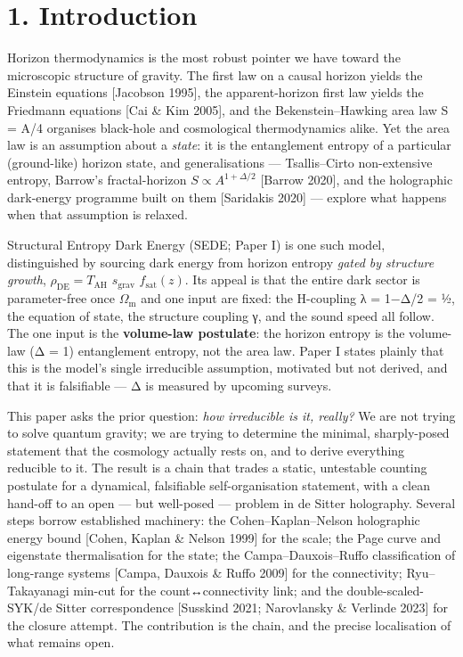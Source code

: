 \documentclass[
  10pt,
]{article}
\begin{document}
{
\hypersetup{linkcolor=}
\setcounter{tocdepth}{2}
\tableofcontents
}
\section{1. Introduction}\label{introduction}

Horizon thermodynamics is the most robust pointer we have toward the
microscopic structure of gravity. The first law on a causal horizon
yields the Einstein equations {[}Jacobson 1995{]}, the apparent-horizon
first law yields the Friedmann equations {[}Cai \& Kim 2005{]}, and the
Bekenstein--Hawking area law S = A/4 organises black-hole and
cosmological thermodynamics alike. Yet the area law is an assumption
about a \emph{state}: it is the entanglement entropy of a particular
(ground-like) horizon state, and generalisations --- Tsallis--Cirto
non-extensive entropy, Barrow's fractal-horizon
\(S \propto  A^{1+\Delta /2}\) {[}Barrow 2020{]}, and the holographic
dark-energy programme built on them {[}Saridakis 2020{]} --- explore
what happens when that assumption is relaxed.

Structural Entropy Dark Energy (SEDE; Paper I) is one such model,
distinguished by sourcing dark energy from horizon entropy \emph{gated
by structure growth}, \(\rho _{\mathrm{DE}} = T_{\mathrm{AH}}\)
\(s_{\mathrm{grav}}\) \(f_{\mathrm{sat}}(z)\). Its appeal is that the
entire dark sector is parameter-free once \(\Omega _{\mathrm{m}}\) and
one input are fixed: the H-coupling λ = 1−Δ/2 = ½, the equation of
state, the structure coupling γ, and the sound speed all follow. The one
input is the \textbf{volume-law postulate}: the horizon entropy is the
volume-law (Δ = 1) entanglement entropy, not the area law. Paper I
states plainly that this is the model's single irreducible assumption,
motivated but not derived, and that it is falsifiable --- Δ is measured
by upcoming surveys.

This paper asks the prior question: \emph{how irreducible is it,
really?} We are not trying to solve quantum gravity; we are trying to
determine the minimal, sharply-posed statement that the cosmology
actually rests on, and to derive everything reducible to it. The result
is a chain that trades a static, untestable counting postulate for a
dynamical, falsifiable self-organisation statement, with a clean
hand-off to an open --- but well-posed --- problem in de Sitter
holography. Several steps borrow established machinery: the
Cohen--Kaplan--Nelson holographic energy bound {[}Cohen, Kaplan \&
Nelson 1999{]} for the scale; the Page curve and eigenstate
thermalisation for the state; the Campa--Dauxois--Ruffo classification
of long-range systems {[}Campa, Dauxois \& Ruffo 2009{]} for the
connectivity; Ryu--Takayanagi min-cut for the count↔connectivity link;
and the double-scaled-SYK/de Sitter correspondence {[}Susskind 2021;
Narovlansky \& Verlinde 2023{]} for the closure attempt. The
contribution is the chain, and the precise localisation of what remains
open.
\end{document}
